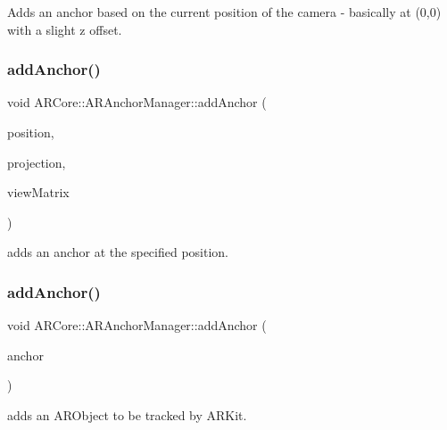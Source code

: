 Adds an anchor based on the current position of the camera -\/ basically at (0,0) with a slight z offset. 

\mbox{\label{class_a_r_core_1_1_a_r_anchor_manager_adcd398aa9ed15e22b7110fcbfa8bd929}} 
\subsubsection{\texorpdfstring{add\+Anchor()}{addAnchor()}\hspace{0.1cm}{\footnotesize\ttfamily [2/3]}}
{\footnotesize\ttfamily void A\+R\+Core\+::\+A\+R\+Anchor\+Manager\+::add\+Anchor (\begin{DoxyParamCaption}\item[{of\+Vec3f}]{position,  }\item[{of\+Matrix4x4}]{projection,  }\item[{of\+Matrix4x4}]{view\+Matrix }\end{DoxyParamCaption})}



adds an anchor at the specified position. 

\mbox{\label{class_a_r_core_1_1_a_r_anchor_manager_ae710a985f06cfe488f218f49e8d0329a}} 
\subsubsection{\texorpdfstring{add\+Anchor()}{addAnchor()}\hspace{0.1cm}{\footnotesize\ttfamily [3/3]}}
{\footnotesize\ttfamily void A\+R\+Core\+::\+A\+R\+Anchor\+Manager\+::add\+Anchor (\begin{DoxyParamCaption}\item[{\hyperlink{struct_a_r_objects_1_1_a_r_object}{A\+R\+Object}}]{anchor }\end{DoxyParamCaption})}



adds an A\+R\+Object to be tracked by A\+R\+Kit. 

